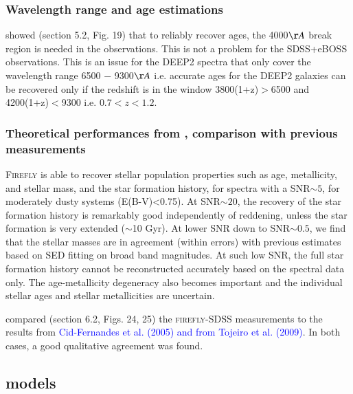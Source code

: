 \documentclass[onecolumn]{aa}
\begin{document}
\subsubsection{Wavelength range and age estimations}
\citet{firefly2017MNRAS} showed (section 5.2, Fig. 19) that to reliably recover ages, the 4000$\AA$ break region is needed in the observations. This is not a problem for the SDSS+eBOSS observations. This is an issue for the DEEP2 spectra that only cover the wavelength range 6500 − 9300$\AA$ i.e. accurate ages for the DEEP2 galaxies can be recovered only if the redshift is in the window 3800(1+z)$>$6500 and 4200(1+z)$<$9300 i.e. $0.7<z<1.2$.

\subsubsection{Theoretical performances from \citet{firefly2017MNRAS}, comparison with previous measurements}
\label{subsec:firefly:performances}
\textsc{Firefly} is able to recover stellar population properties such as age, metallicity, and stellar mass, and the star formation history, 
for spectra with a SNR$\sim5$, for moderately dusty systems (E(B-V)<0.75). 
At SNR$\sim20$, the recovery of the star formation history is remarkably good independently of reddening, unless the star formation is very extended ($\sim$10 Gyr). 
At lower SNR down to SNR$\sim0.5$, we find that the stellar masses are in agreement (within errors) with previous estimates based on SED fitting on broad band magnitudes. 
At such low SNR, the full star formation history cannot be reconstructed accurately based on the spectral data only. 
The age-metallicity degeneracy also becomes important and the individual stellar ages and stellar metallicities are uncertain.

\citet{firefly2017MNRAS} compared (section 6.2, Figs. 24, 25) the \textsc{firefly}-SDSS measurements to the results from \textcolor{blue}{Cid-Fernandes et al. (2005) and from Tojeiro et al. (2009)}. In both cases, a good qualitative agreement was found.

\subsection{\citet{Maraston_2011} models}
\label{subsec:SPMmodels}
\end{document}
